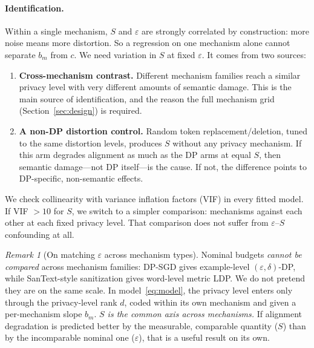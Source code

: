 \documentclass{article}
\theoremstyle{definition}
\theoremstyle{plain}
\theoremstyle{remark}
\newtheorem{remark}{Remark}[section]
\newcommand{\eps}{\varepsilon}
\newcommand{\Sdist}{S}
\newcommand{\secref}[1]{Section~\ref{sec:#1}}
\begin{document}
\paragraph{Identification.}
Within a single mechanism, $\Sdist$ and $\eps$ are strongly correlated by
construction: more noise means more distortion. So a regression on one
mechanism alone cannot separate $b_m$ from $c$. We need variation in
$\Sdist$ at fixed $\eps$. It comes from two sources:
\begin{enumerate}[left=0pt,itemsep=1pt,topsep=1pt]
 \item \textbf{Cross-mechanism contrast.} Different mechanism families reach
 a similar privacy level with very different amounts of semantic damage.
 This is the main source of identification, and the reason the full
 mechanism grid (\secref{design}) is required.
 \item \textbf{A non-DP distortion control.} Random token
 replacement/deletion, tuned to the same distortion levels, produces
 $\Sdist$ without any privacy mechanism. If this arm degrades alignment
 as much as the DP arms at equal $\Sdist$, then semantic damage---not DP
 itself---is the cause. If not, the difference points to DP-specific,
 non-semantic effects.
\end{enumerate}
We check collinearity with variance inflation factors (VIF) in every fitted
model. If VIF $>10$ for $\Sdist$, we switch to a simpler comparison:
mechanisms against each other at each fixed privacy level. That comparison
does not suffer from $\eps$--$\Sdist$ confounding at all.

\begin{remark}[On matching $\eps$ across mechanism types]\label{rem:eps}
Nominal budgets \emph{cannot be compared} across mechanism families: DP-SGD
gives example-level $(\eps,\delta)$-DP, while SanText-style sanitization gives
word-level metric LDP. We do not pretend they are on the same scale. In
model~\eqref{eq:model}, the privacy level enters only through the privacy-level rank
$d$, coded within its own mechanism and given a per-mechanism slope $b_m$.
\emph{$\Sdist$ is the common axis across mechanisms.} If alignment degradation is predicted better
by the measurable, comparable quantity ($\Sdist$) than by the incomparable
nominal one ($\eps$), that is a useful result on its own.
\end{remark}
\end{document}
